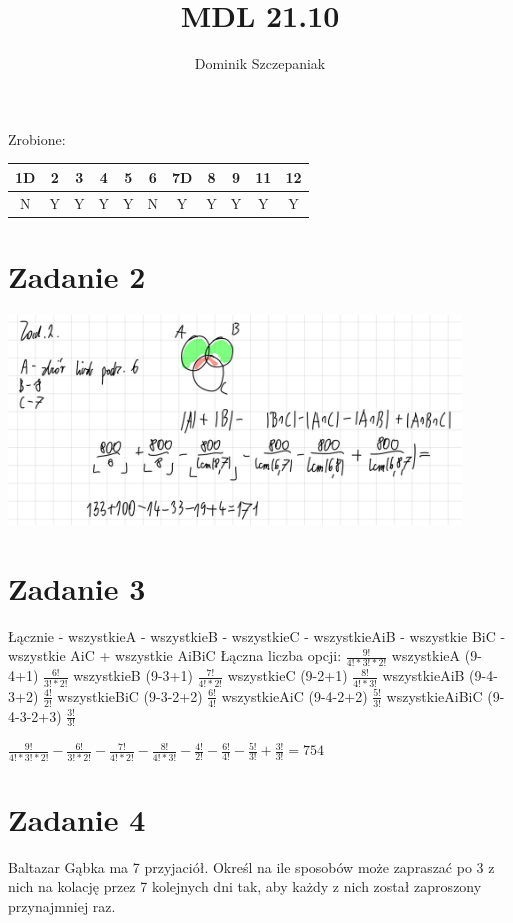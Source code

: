 \documentclass[12pt]{article}
\title{MDL 21.10}
\author{Dominik Szczepaniak}
\begin{document}
\maketitle
Zrobione:
\begin{tabular}{|| c c c c c c c c c c c||}
    \hline
    1D & 2 & 3 & 4 & 5 & 6 & 7D & 8 & 9 & 11 & 12 \\
    \hline
    N & Y & Y & Y & Y & N & Y & Y & Y & Y & Y
\end{tabular}

\bgroup\obeylines

\section{Zadanie 2}
\includegraphics[width=120mm]{zad2}

\section{Zadanie 3}
Łącznie - wszystkieA - wszystkieB - wszystkieC - wszystkieAiB - wszystkie BiC - wszystkie AiC + wszystkie AiBiC
Łączna liczba opcji: 
$\frac{9!}{4!*3!*2!}$
wszystkieA (9-4+1)
$\frac{6!}{3!*2!}$
wszystkieB (9-3+1)
$\frac{7!}{4!*2!}$
wszystkieC (9-2+1)
$\frac{8!}{4!*3!}$
wszystkieAiB (9-4-3+2)
$\frac{4!}{2!}$
wszystkieBiC (9-3-2+2)
$\frac{6!}{4!}$
wszystkieAiC (9-4-2+2)
$\frac{5!}{3!}$
wszystkieAiBiC (9-4-3-2+3)
$\frac{3!}{3!}$ 

$\frac{9!}{4!*3!*2!} - \frac{6!}{3!*2!} - \frac{7!}{4!*2!} - \frac{8!}{4!*3!} - \frac{4!}{2!} - \frac{6!}{4!} - \frac{5!}{3!} + \frac{3!}{3!} = 754$


\section{Zadanie 4}
Baltazar Gąbka ma 7 przyjaciół. Określ na ile sposobów może zapraszać po 3 z nich na kolację przez 7 kolejnych dni tak, aby każdy z nich został zaproszony przynajmniej raz.
\end{document}
